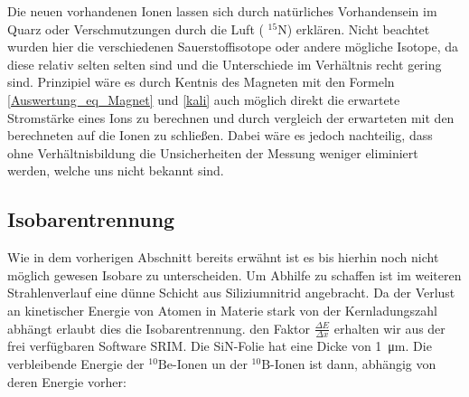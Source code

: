 Die neuen vorhandenen Ionen lassen sich durch natürliches Vorhandensein im Quarz oder Verschmutzungen durch die Luft ( $^{15}$N) erklären.
Nicht beachtet wurden hier die verschiedenen Sauerstoffisotope oder andere mögliche Isotope, da diese relativ selten selten sind und die Unterschiede im Verhältnis recht gering sind.
Prinzipiel wäre es durch Kentnis des Magneten mit den Formeln \ref{Auswertung_eq_Magnet} und \ref{kali} auch möglich direkt die erwartete Stromstärke eines Ions zu berechnen und durch vergleich der erwarteten mit den berechneten auf die Ionen zu schließen.
Dabei wäre es jedoch nachteilig, dass ohne Verhältnisbildung die Unsicherheiten der Messung weniger eliminiert werden, welche uns nicht bekannt sind.

\clearpage

\subsection{Isobarentrennung}
Wie in dem vorherigen Abschnitt bereits erwähnt ist es bis hierhin noch nicht möglich gewesen Isobare zu unterscheiden.
Um Abhilfe zu schaffen ist im weiteren Strahlenverlauf eine dünne Schicht aus Siliziumnitrid angebracht.
Da der Verlust an kinetischer Energie von Atomen in Materie stark von der Kernladungszahl abhängt erlaubt dies die Isobarentrennung.
den Faktor $\frac{\Delta E}{\Delta x}$ erhalten wir aus der frei verfügbaren Software SRIM.
Die SiN-Folie hat eine Dicke von \SI{1}{\micro\metre}.
Die verbleibende Energie der $^{10}\text{Be}$-Ionen un der $^{10}\text{B}$-Ionen ist dann, abhängig von deren Energie vorher:
